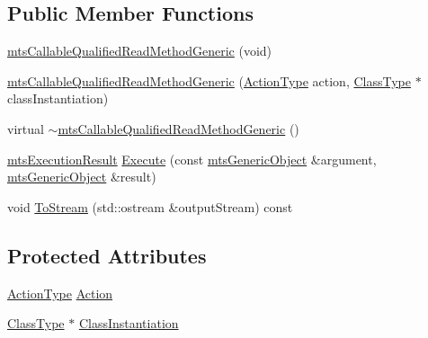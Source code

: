 \subsection*{Public Member Functions}
\begin{DoxyCompactItemize}
\item 
\hyperlink{classmts_callable_qualified_read_method_generic_a37061746218d1cec908ce78393d4fe56}{mts\-Callable\-Qualified\-Read\-Method\-Generic} (void)
\item 
\hyperlink{classmts_callable_qualified_read_method_generic_a952cdaf09a287de112a758b9f5c36c20}{mts\-Callable\-Qualified\-Read\-Method\-Generic} (\hyperlink{classmts_callable_qualified_read_method_generic_acf52fbc6f885178cd934f20cfcd96872}{Action\-Type} action, \hyperlink{classmts_callable_qualified_read_method_generic_ada2d394b00a2db849dd5d67b965fd63b}{Class\-Type} $\ast$class\-Instantiation)
\item 
virtual \hyperlink{classmts_callable_qualified_read_method_generic_a98261d23e50a97a2923ee04f8ffd193a}{$\sim$mts\-Callable\-Qualified\-Read\-Method\-Generic} ()
\item 
\hyperlink{classmts_execution_result}{mts\-Execution\-Result} \hyperlink{classmts_callable_qualified_read_method_generic_a489b1a5368c0e7533f634830723fe0af}{Execute} (const \hyperlink{classmts_generic_object}{mts\-Generic\-Object} \&argument, \hyperlink{classmts_generic_object}{mts\-Generic\-Object} \&result)
\item 
void \hyperlink{classmts_callable_qualified_read_method_generic_a7c8f5ed8525397fdfeda642e0d3888d1}{To\-Stream} (std\-::ostream \&output\-Stream) const 
\end{DoxyCompactItemize}
\subsection*{Protected Attributes}
\begin{DoxyCompactItemize}
\item 
\hyperlink{classmts_callable_qualified_read_method_generic_acf52fbc6f885178cd934f20cfcd96872}{Action\-Type} \hyperlink{classmts_callable_qualified_read_method_generic_a39b88372b35325f8ed51a406e42b9c51}{Action}
\item 
\hyperlink{classmts_callable_qualified_read_method_generic_ada2d394b00a2db849dd5d67b965fd63b}{Class\-Type} $\ast$ \hyperlink{classmts_callable_qualified_read_method_generic_aa2cc99ad37b816f02a8287a26e3f22b0}{Class\-Instantiation}
\end{DoxyCompactItemize}


